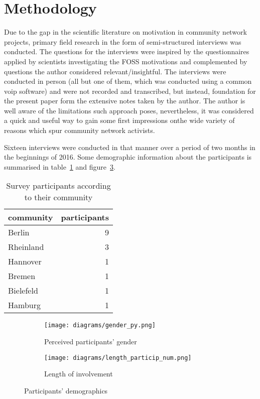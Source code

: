 \section{Methodology}

Due to the gap in the scientific literature on motivation in community network projects, primary field research in the form of semi-structured interviews was conducted.
The questions for the interviews were inspired by the questionnaires applied by scientists investigating the FOSS motivations\cite{HarOu2002}\cite{LakWo2005} and complemented by questions the author considered relevant/insightful. %
The interviews were conducted in person (all but one of them, which was conducted using a common voip software) and were not recorded and transcribed, but instead, foundation for the present paper form the extensive notes taken by the author. %
The author is well aware of the limitations such approach poses, nevertheless, it was considered a quick and useful way to gain some first impressions onthe wide variety of reasons which spur community network activists.

Sixteen interviews were conducted in that manner over a period of two months in the beginnings of 2016.
Some demographic information about the participants is summarised in table~\ref{tab:communities} and figure~\ref{fig:demography}.

\begin{table}[h]
  \begin{tabular}{| l | r |}
    \hline
    \textbf{community} & \textbf{participants}\\
    \hline
    Berlin & 9 \\
    \hline
    Rheinland & 3 \\
    \hline
    Hannover & 1 \\
    \hline
    Bremen & 1 \\
    \hline
    Bielefeld & 1 \\
    \hline
    Hamburg & 1 \\
    \hline
  \end{tabular}
\caption{Survey participants according to their community}
\label{tab:communities}
\end{table}

\begin{figure}[h]
  \begin{subfigure}[h]{0.5\textwidth}
    \centering
    \texttt{[image: diagrams/gender\_py.png]}
    \caption{Perceived participants' gender}
    \label{fig:gender}
  \end{subfigure}
  \qquad
  \begin{subfigure}[h]{0.5\textwidth}
    \centering
    \texttt{[image: diagrams/length\_particip\_num.png]}
    \caption{Length of involvement}
    \label{fig:length}
  \end{subfigure}
  \caption{Participants' demographics}
  \label{fig:demography}
\end{figure}

